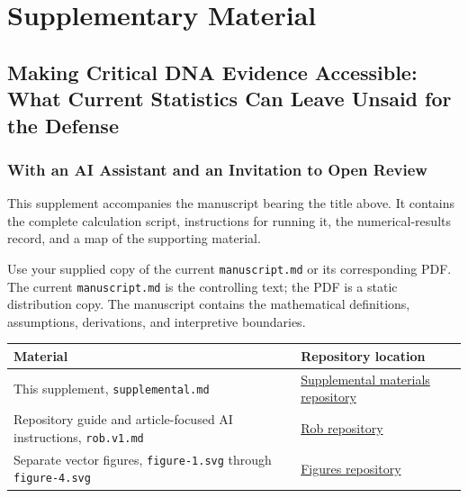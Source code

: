\documentclass[
]{article}
\author{}
\date{}
\newcounter{none} %
\begin{document}
\section{Supplementary Material}\label{supplementary-material}

\subsection{Making Critical DNA Evidence Accessible: What Current
Statistics Can Leave Unsaid for the
Defense}\label{making-critical-dna-evidence-accessible-what-current-statistics-can-leave-unsaid-for-the-defense}

\subsubsection{With an AI Assistant and an Invitation to Open
Review}\label{with-an-ai-assistant-and-an-invitation-to-open-review}

This supplement accompanies the manuscript bearing the title above. It
contains the complete calculation script, instructions for running it,
the numerical-results record, and a map of the supporting material.

Use your supplied copy of the current \texttt{manuscript.md} or its
corresponding PDF. The current \texttt{manuscript.md} is the controlling
text; the PDF is a static distribution copy. The manuscript contains the
mathematical definitions, assumptions, derivations, and interpretive
boundaries.

{\def\LTcaptype{none} %
\begin{longtable}[]{@{}
  >{\raggedright\arraybackslash}p{}
  >{\raggedright\arraybackslash}p{}@{}}
\toprule\noalign{}
\begin{minipage}[b]{\linewidth}\raggedright
Material
\end{minipage} & \begin{minipage}[b]{\linewidth}\raggedright
Repository location
\end{minipage} \\
\midrule\noalign{}
\endhead
\bottomrule\noalign{}
\endlastfoot
This supplement, \texttt{supplemental.md} &
\href{https://github.com/mmiller-ForensicDNAexperts/supplemental_materials}{Supplemental
materials repository} \\
Repository guide and article-focused AI instructions, \texttt{rob.v1.md}
& \href{https://github.com/mmiller-ForensicDNAexperts/rob.v1.md}{Rob
repository} \\
Separate vector figures, \texttt{figure-1.svg} through
\texttt{figure-4.svg} &
\href{https://github.com/mmiller-ForensicDNAexperts/Figures}{Figures
repository} \\
\end{longtable}
}
\end{document}
